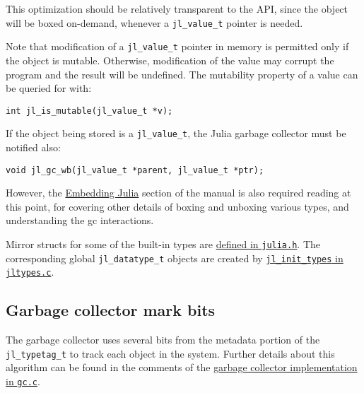 This optimization should be relatively transparent to the API, since the object will be {\textquotedbl}boxed{\textquotedbl} on-demand, whenever a \texttt{jl\_value\_t} pointer is needed.



Note that modification of a \texttt{jl\_value\_t} pointer in memory is permitted only if the object is mutable. Otherwise, modification of the value may corrupt the program and the result will be undefined. The mutability property of a value can be queried for with:




\begin{lstlisting}
int jl_is_mutable(jl_value_t *v);
\end{lstlisting}



If the object being stored is a \texttt{jl\_value\_t}, the Julia garbage collector must be notified also:




\begin{lstlisting}
void jl_gc_wb(jl_value_t *parent, jl_value_t *ptr);
\end{lstlisting}



However, the \hyperlink{51310765964131637}{Embedding Julia} section of the manual is also required reading at this point, for covering other details of boxing and unboxing various types, and understanding the gc interactions.



Mirror structs for some of the built-in types are \href{https://github.com/JuliaLang/julia/blob/master/src/julia.h}{defined in \texttt{julia.h}}. The corresponding global \texttt{jl\_datatype\_t} objects are created by \href{https://github.com/JuliaLang/julia/blob/master/src/jltypes.c}{\texttt{jl\_init\_types} in \texttt{jltypes.c}}.



\hypertarget{660883080955975432}{}


\subsection{Garbage collector mark bits}



The garbage collector uses several bits from the metadata portion of the \texttt{jl\_typetag\_t} to track each object in the system. Further details about this algorithm can be found in the comments of the \href{https://github.com/JuliaLang/julia/blob/master/src/gc.c}{garbage collector implementation in \texttt{gc.c}}.



